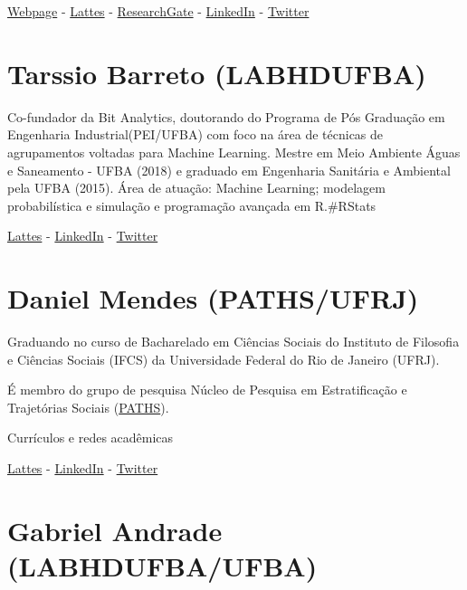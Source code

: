 \documentclass[
]{book}
\begin{document}
\href{https://vmussa.github.io}{Webpage} - \href{http://lattes.cnpq.br/2934187748254130}{Lattes} - \href{https://www.researchgate.net/profile/Vitor-Mussa-2}{ResearchGate} - \href{https://www.linkedin.com/in/vmussa/}{LinkedIn} - \href{https://twitter.com/vitormussa}{Twitter}

\hypertarget{tarssio-barreto-labhdufba}{%
\section{Tarssio Barreto (LABHDUFBA)}\label{tarssio-barreto-labhdufba}}

Co-fundador da Bit Analytics, doutorando do Programa de Pós Graduação em Engenharia Industrial(PEI/UFBA) com foco na área de técnicas de agrupamentos voltadas para Machine Learning. Mestre em Meio Ambiente Águas e Saneamento - UFBA (2018) e graduado em Engenharia Sanitária e Ambiental pela UFBA (2015). Área de atuação: Machine Learning; modelagem probabilística e simulação e programação avançada em R.\#RStats

\href{http://lattes.cnpq.br/8314700954142455}{Lattes} -
\href{https://www.linkedin.com/in/tarssio-brito-barreto-9646b817b/}{LinkedIn} -
\href{https://twitter.com/danielmnds34}{Twitter}

\hypertarget{daniel-mendes-pathsufrj}{%
\section{Daniel Mendes (PATHS/UFRJ)}\label{daniel-mendes-pathsufrj}}

Graduando no curso de Bacharelado em Ciências Sociais do Instituto de Filosofia e Ciências Sociais (IFCS) da Universidade Federal do Rio de Janeiro (UFRJ).

É membro do grupo de pesquisa Núcleo de Pesquisa em Estratificação e Trajetórias Sociais (\href{https://www.facebook.com/paths.research/}{PATHS}).

Currículos e redes acadêmicas

\href{http://lattes.cnpq.br/9834413442426550}{Lattes} - \href{https://www.linkedin.com/in/daniel-mendes-251212176/}{LinkedIn} - \href{https://twitter.com/danielmnds34}{Twitter}

\hypertarget{gabriel-andrade-labhdufbaufba}{%
\section{Gabriel Andrade (LABHDUFBA/UFBA)}\label{gabriel-andrade-labhdufbaufba}}
\end{document}
